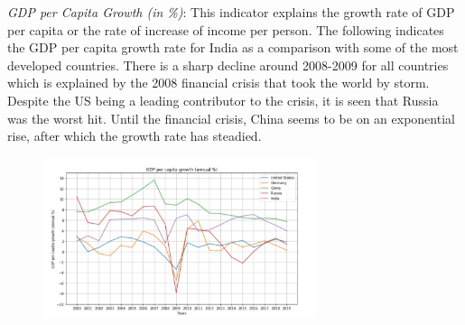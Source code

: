 \documentclass[conference]{IEEEtran}
\begin{document}

\textit{GDP per Capita Growth (in \%)}:  This indicator explains the growth rate of GDP per capita or the rate of increase of income per person. The following indicates the GDP per capita growth rate for India as a comparison with some of the most developed countries. There is a sharp decline around 2008-2009 for all countries which is explained by the 2008 financial crisis that took the world by storm. Despite the US being a leading contributor to the crisis, it is seen that Russia was the worst hit. Until the financial crisis, China seems to be on an exponential rise, after which the growth rate has steadied.

\begin{figure}[htp]
    \centering
    \includegraphics[width=8cm]{gdpcap.png}
    \label{fig:my_label}
\end{figure}
\end{document}
